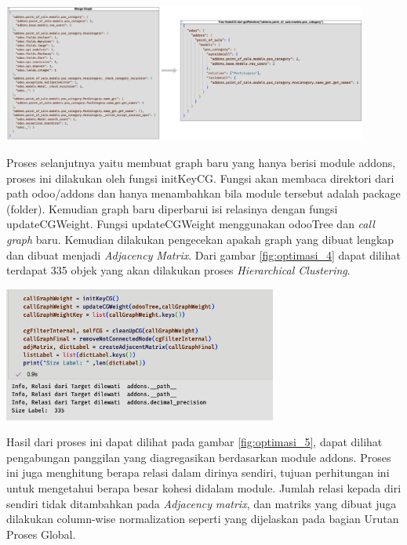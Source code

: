 \begin{center}
	\includegraphics[width=12cm]{img/bab_4/optimisasi_3.png}
	\label{fig:optimasi_3}
\end{center}

Proses selanjutnya yaitu membuat graph baru yang hanya berisi module addons, proses ini dilakukan oleh fungsi initKeyCG. Fungsi akan membaca direktori dari path odoo/addons dan hanya menambahkan bila module tersebut adalah package (folder). Kemudian graph baru diperbarui isi relasinya dengan fungsi updateCGWeight. Fungsi updateCGWeight menggunakan odooTree dan \textit{call graph} baru. Kemudian dilakukan pengecekan apakah graph yang dibuat lengkap dan dibuat menjadi \textit{Adjacency} \textit{Matrix}.  Dari gambar \ref{fig:optimasi_4} dapat dilihat terdapat 335 objek yang akan dilakukan proses \textit{Hierarchical Clustering}.

\begin{center}
	\includegraphics[width=9cm]{img/bab_4/optimisasi_4.png}
	\label{fig:optimasi_4}
\end{center}

Hasil dari proses ini dapat dilihat pada gambar \ref{fig:optimasi_5}, dapat dilihat pengabungan panggilan yang diagregasikan berdasarkan module addons. Proses ini juga menghitung berapa relasi dalam dirinya sendiri, tujuan perhitungan ini untuk mengetahui berapa besar kohesi didalam module. Jumlah relasi kepada diri sendiri tidak ditambahkan pada \textit{Adjacency} \textit{matrix}, dan matriks yang dibuat juga dilakukan column-wise normalization seperti yang dijelaskan pada bagian Urutan Proses Global.  

